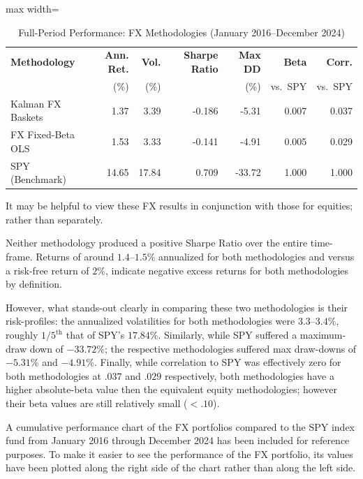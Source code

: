 \documentclass[12pt]{article}
\begin{document}
\begin{table}[H]
\centering
\caption{Full-Period Performance: FX Methodologies (January 2016--December 2024)}
\label{tab:fx_perf}
\begingroup
\singlespacing
\footnotesize
\setlength{\tabcolsep}{4pt}
\renewcommand{\arraystretch}{1.12}
\begin{adjustbox}{max width=\textwidth}
\begin{tabular}{lrrrrrr}
\hline
\textbf{Methodology} &
\textbf{Ann. Ret.} &
\textbf{Vol.} &
\textbf{Sharpe Ratio} &
\textbf{Max DD} &
\textbf{Beta} &
\textbf{Corr.} \\
& (\%) & (\%) & & (\%) & vs.\ SPY & vs.\ SPY \\
\hline
Kalman FX Baskets & 1.37 & 3.39 & -0.186 & -5.31 & 0.007 & 0.037 \\
FX Fixed-Beta OLS & 1.53 & 3.33 & -0.141 & -4.91 & 0.005 & 0.029 \\
SPY (Benchmark) & 14.65 & 17.84 & 0.709 & -33.72 & 1.000 & 1.000 \\
\hline
\end{tabular}
\end{adjustbox}
\endgroup
\end{table}

It may be helpful to view these FX results in conjunction with those for equities; rather than separately.

Neither methodology produced a positive Sharpe Ratio over the entire time-frame. Returns of around $1.4$--$1.5\%$ annualized for both methodologies and versus a risk-free return of $2\%$, indicate negative excess returns for both methodologies by definition.

However, what stands-out clearly in comparing these two methodologies is their risk-profiles: the annualized volatilities for both methodologies were $3.3$--$3.4\%$, roughly $1/5^{\text{th}}$ that of SPY's $17.84\%$. Similarly, while SPY suffered a maximum-draw down of $-33.72\%$; the respective methodologies suffered max draw-downs of $-5.31\%$ and $-4.91\%$. Finally, while correlation to SPY was effectively zero for both methodologies at $.037$ and $.029$ respectively, both methodologies have a higher absolute-beta value then the equivalent equity methodologies; however their beta values are still relatively small ($<.10$).

A cumulative performance chart of the FX portfolios compared to the SPY index fund from January 2016 through December 2024 has been included for reference purposes. To make it easier to see the performance of the FX portfolio, its values have been plotted along the right side of the chart rather than along the left side.
\end{document}
